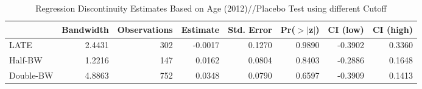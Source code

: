 \begin{table}[ht]
\centering
\begin{tabular}{lrrrrrrr}
  \hline
 & Bandwidth & Observations & Estimate & Std. Error & Pr($>$$|$z$|$) & CI (low) & CI (high) \\ 
  \hline
LATE & 2.4431 & 302 & -0.0017 & 0.1270 & 0.9890 & -0.3902 & 0.3360 \\ 
  Half-BW & 1.2216 & 147 & 0.0162 & 0.0804 & 0.8403 & -0.2886 & 0.1648 \\ 
  Double-BW & 4.8863 & 752 & 0.0348 & 0.0790 & 0.6597 & -0.3909 & 0.1413 \\ 
   \hline
\end{tabular}
\caption{Regression Discontinuity Estimates Based on Age (2012)//Placebo Test using different Cutoff} 
\label{tab:rd2012_plac}
\end{table}
